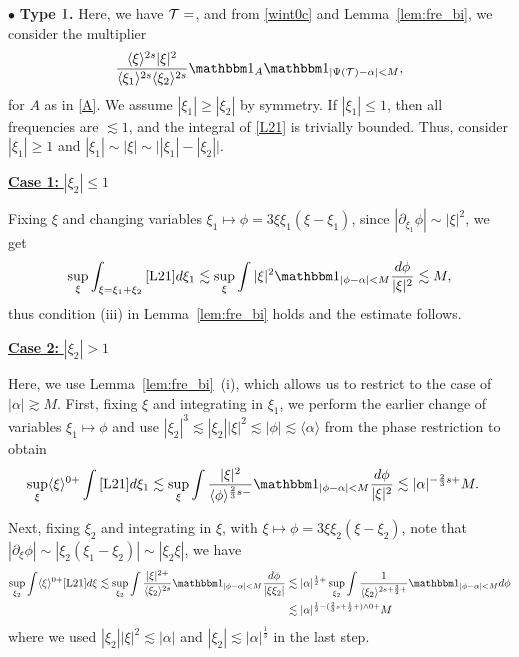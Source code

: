 \documentclass[a4paper,
11pt,  reqno]{amsart}
\makeatletter
\newcommand{\I}{\hspace{0.2mm}\textup{I}\hspace{0.2mm}}
\newcommand{\5}{\textup{V}}
\newcommand{\noi}{\noindent}
\newcommand{\ind}{\mathbbm 1}
\newcommand{\les}{\lesssim}
\theoremstyle{remark}
\newcommand{\bul}{\bullet}
\newcommand{\TT}{\mathcal{T}}
\newcommand{\al}{\alpha}
\newcommand{\ges}{\gtrsim}
\newcommand{\jb}[1]
{\langle #1 \rangle}
\def\<#1>{\csname MH@symb@#1\endcsname}
\numberwithin{equation}{section}
\numberwithin{theorem}{section}
\makeatother
\begin{document}
\smallskip

\noi
$\bul$ \textbf{Type $\I$.}
Here, we have $\TT = \<1>$, and
from \eqref{wint0c} and Lemma~\ref{lem:fre_bi}, we consider the multiplier
\begin{align}
\label{L21}
 \frac{\jb{\xi}^{2s} |\xi|^2 }{\jb{\xi_1}^{2s}\jb{\xi_2}^{2s}}
    \ind_A \ind_{|\Psi(\TT) - \al| < M } ,
\end{align}
 for $A$ as in \eqref{A}. We assume $|\xi_1| \ge |\xi_2|$ by symmetry.
If $|\xi_1| \le 1$, then all frequencies are $\les 1$, and the integral of \eqref{L21} is trivially bounded. Thus, consider $|\xi_1| \ge 1$ and $|\xi_1| \sim |\xi| \sim \big| |\xi_1| - |\xi_2| \big|$.


\smallskip

\noi\underline{\textbf{Case 1:} $|\xi_2| \le 1$}


Fixing $\xi$ and changing variables $\xi_1 \mapsto \phi = 3 \xi\xi_1(\xi-\xi_1)$, since $|\partial_{\xi_1}\phi| \sim |\xi|^2$, we get
\begin{align}\label{eq:estL21}
    \sup_\xi \int_{\xi=\xi_1+\xi_2} \eqref{L21} d\xi_1
    \les \sup_\xi \int |\xi|^2 \ind_{|\phi - \al| < M } \frac{d\phi}{|\xi|^2 } \les M ,
\end{align}
thus condition (iii) in Lemma~\ref{lem:fre_bi} holds and the estimate follows.

\smallskip

\noi\underline{\textbf{Case 2:} $|\xi_2| > 1$}

Here, we use Lemma~\ref{lem:fre_bi}~(i), which allows us to restrict to the case of $|\al| \ges M$.
First, fixing $\xi$ and integrating in $\xi_1$, we perform the earlier change of variables $\xi_1 \mapsto \phi$ and use $|\xi_2|^3 \les |\xi_2| |\xi|^2 \les |\phi| \les \jb{\al}$ from the phase restriction to obtain
\begin{align}
    \sup_{\xi} \jb{\xi}^{0+}\int \eqref{L21} d\xi_1
    &
    \les
    \sup_\xi
    \int \frac{|\xi|^{2}}{\jb{\phi}^{\frac23s-}} \ind_{|\phi-\al| < M} \frac{d\phi}{|\xi|^2}
    \les |\al|^{-\frac23 s+} M .
\end{align}

Next, fixing $\xi_2$ and integrating in $\xi$, with $\xi \mapsto \phi = 3\xi \xi_2 (\xi-\xi_2)$, note that $|\partial_\xi \phi| \sim |\xi_2 (\xi_1-\xi_2)| \sim |\xi_2 \xi|$, we have
\begin{align}
\sup_{\xi_2} \int \jb{\xi}^{0+} \eqref{L21} d\xi
\les \sup_{\xi_2} \int \frac{|\xi|^{2+}}{\jb{\xi_2}^{2s}} \ind_{|\phi-\al| < M} \frac{d\phi}{|\xi\xi_2|}
&
\les
|\al|^{\frac12+}
\sup_{\xi_2} \int \frac{1}{\jb{\xi_2}^{2s+\frac32+}} \ind_{|\phi-\al| < M } d\phi
\\
&
\les
|\al|^{\frac12 - (\frac23 s + \frac12 +) \land 0
+ } M
\end{align}
where we used $|\xi_2| |\xi|^2 \les |\al|$ and $|\xi_2| \les |\al|^{\frac13}$ in the last step.
\end{document}
